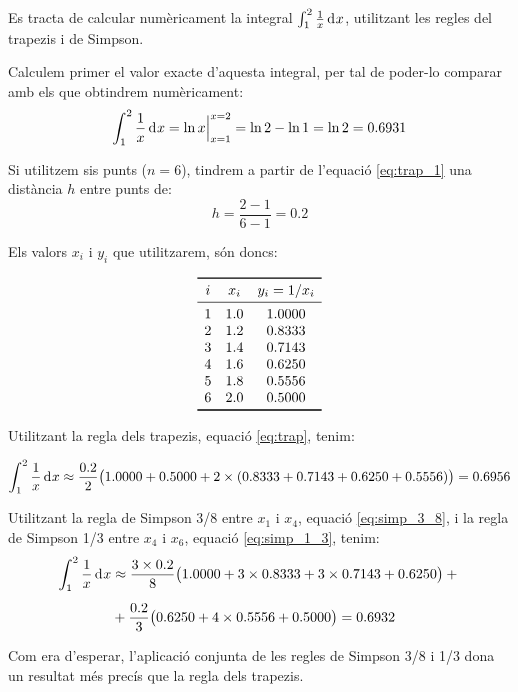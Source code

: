 \begin{exemple}
    Es tracta de calcular numèricament la integral $\int_1^2 \frac{1}{x} \diff x$, utilitzant les regles del trapezis i de Simpson.

    Calculem primer el valor exacte d'aquesta integral, per tal de poder-lo comparar amb els que obtindrem  numèricament:
    \[
      \int_1^2 \frac{1}{x} \diff x = \ln x \Bigr|_{x=1}^{x=2} = \ln 2 - \ln 1 = \ln 2 = \num{0,6931}
    \]

    Si utilitzem sis punts ($n=6$), tindrem a partir de l'equació \eqref{eq:trap_1} una distància $h$ entre punts de:
    \[
        h = \frac{2-1}{6-1} = \num{0,2}
    \]

    Els valors $x_i$ i $y_i$ que utilitzarem, són doncs:
    \vspace{-8mm}
    \begin{center}
        \[\begin{array}{ccc}
           \toprule[1pt]
              i & x_i  & y_i = 1/x_i \\
           \midrule
              1 & \num{1,0} & \num{1,0000} \\
              2 & \num{1,2} & \num{0,8333} \\
              3 & \num{1,4} & \num{0,7143} \\
              4 & \num{1,6} & \num{0.6250} \\
              5 & \num{1,8} & \num{0.5556} \\
              6 & \num{2,0} & \num{0,5000} \\
           \bottomrule[1pt]
        \end{array} \]
    \end{center}

    \pagebreak
    Utilitzant la regla dels trapezis, equació \eqref{eq:trap}, tenim:

    \[
        \int_1^2 \frac{1}{x} \diff x \approx \frac{\num{0,2}}{2} \big(\num{1,0000}+\num{0,5000} +2 \times(\num{0,8333}+ \num{0,7143} +
        \num{0,6250} + \num{0,5556}) \big) = \num{0,6956}
    \]

    Utilitzant la regla de Simpson 3/8 entre $x_1$ i $x_4$, equació \eqref{eq:simp_3_8}, i la  regla de Simpson 1/3 entre $x_4$ i $x_6$, equació \eqref{eq:simp_1_3}, tenim:
    \[\begin{split}
        \int_1^2 \frac{1}{x} \diff x &\approx \frac{3\times\num{0,2}}{8} \big(\num{1,0000}+3\times\num{0,8333} +3\times \num{0,7143} +
        \num{0,6250} \big) +{}\\[0.5em]
        {}&+ \frac{\num{0,2}}{3} \big(\num{0,6250} +4\times \num{0,5556} + \num{0,5000} \big)
        = \num{0,6932}
    \end{split}\]

    Com era d'esperar, l'aplicació conjunta de les regles de Simpson 3/8 i 1/3 dona un resultat més precís que la regla dels trapezis.
\end{exemple}


